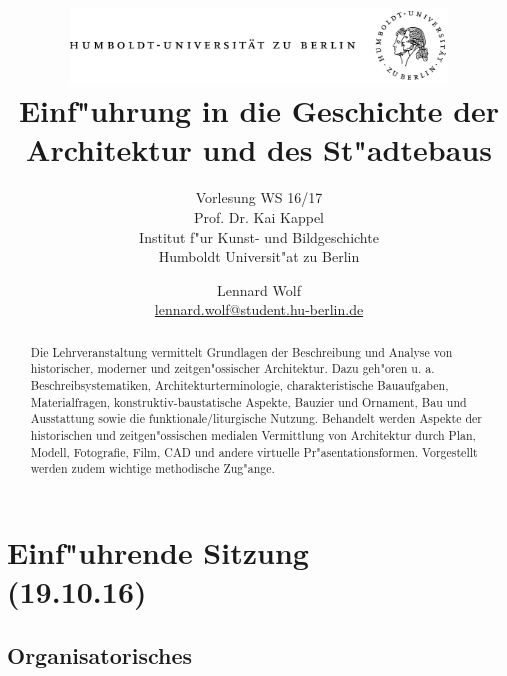 \documentclass[]{scrartcl}
\begin{document}
\title{
	\includegraphics*[width=0.75\textwidth]{images/hu_logo.png}\\
	\vspace{24pt}
	Einf"uhrung in die Geschichte der Architektur und des St"adtebaus}
\subtitle{Vorlesung WS 16/17\\
          Prof. Dr. Kai Kappel\\
          Institut f"ur Kunst- und Bildgeschichte \\ 
          Humboldt Universit"at zu Berlin}
\author{Lennard Wolf\\
        \href{mailto:lennard.wolf@student.hu-berlin.de}{lennard.wolf@student.hu-berlin.de}}
\maketitle
\begin{abstract}
Die Lehrveranstaltung vermittelt Grundlagen der Beschreibung und Analyse von historischer, moderner und zeitgen"ossischer Architektur. Dazu geh"oren u. a. Beschreibsystematiken, Architekturterminologie, charakteristische Bauaufgaben, Materialfragen, konstruktiv-baustatische Aspekte, Bauzier und Ornament, Bau und Ausstattung sowie die funktionale/liturgische Nutzung. Behandelt werden Aspekte der historischen und zeitgen"ossischen medialen Vermittlung von Architektur durch Plan, Modell, Fotografie, Film, CAD und andere virtuelle Pr"asentationsformen. Vorgestellt werden zudem wichtige methodische Zug"ange.
\end{abstract}
\newpage

\tableofcontents

\listoffigures
\newpage


\section{Einf"uhrende Sitzung\\(19.10.16)}



\subsection{Organisatorisches}
\end{document}
